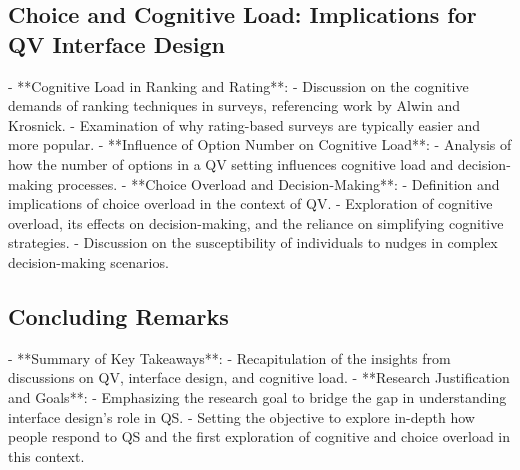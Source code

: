 \subsection{Choice and Cognitive Load: Implications for QV Interface Design}
- **Cognitive Load in Ranking and Rating**: 
  - Discussion on the cognitive demands of ranking techniques in surveys, referencing work by Alwin and Krosnick.
  - Examination of why rating-based surveys are typically easier and more popular.
- **Influence of Option Number on Cognitive Load**: 
  - Analysis of how the number of options in a QV setting influences cognitive load and decision-making processes.
- **Choice Overload and Decision-Making**: 
  - Definition and implications of choice overload in the context of QV.
  - Exploration of cognitive overload, its effects on decision-making, and the reliance on simplifying cognitive strategies.
  - Discussion on the susceptibility of individuals to nudges in complex decision-making scenarios.

\subsection{Concluding Remarks}
- **Summary of Key Takeaways**: 
  - Recapitulation of the insights from discussions on QV, interface design, and cognitive load.
- **Research Justification and Goals**: 
  - Emphasizing the research goal to bridge the gap in understanding interface design's role in QS.
  - Setting the objective to explore in-depth how people respond to QS and the first exploration of cognitive and choice overload in this context.




